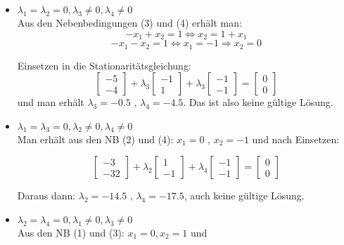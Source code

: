 \documentclass[a4paper, 12pt]{report}
\begin{document}
\begin{itemize}
  \item $\lambda_1 = \lambda_2 = 0, \lambda_3 \neq 0, \lambda_4 \neq 0$\\
  Aus den Nebenbedingungen (3) und (4) erhält man:\\
  $$ -x_1 + x_2 = 1 \Leftrightarrow x_2 = 1 + x_1$$
  $$ -x_1 - x_2 = 1 \Leftrightarrow x_1 = -1 \Rightarrow x_2 = 0$$

  Einsetzen in die Stationaritätsgleichung:
  $$\begin{bmatrix}-5\\-4\end{bmatrix} + \lambda_3 \begin{bmatrix}-1\\1\end{bmatrix} + \lambda_3 \begin{bmatrix}-1\\-1\end{bmatrix} = \begin{bmatrix}0\\0\end{bmatrix}$$
  und man erhält $\lambda_3 = -0.5 \text{ , } \lambda_4 = -4.5$. Das ist also keine gültige Lösung.

  \item $\lambda_1 = \lambda_3 = 0, \lambda_2 \neq 0, \lambda_4 \neq 0$\\
  Man erhält aus den NB (2) und (4): $x_1 = 0 \text{ , } x_2 = -1$ und nach Einsetzen:

  $$\begin{bmatrix}-3\\-32\end{bmatrix} + \lambda_2 \begin{bmatrix}1\\-1\end{bmatrix} + \lambda_4 \begin{bmatrix}-1\\-1\end{bmatrix} = \begin{bmatrix}0\\0\end{bmatrix}$$

  Daraus dann: $\lambda_2 = -14.5 \text{ , } \lambda_4 = -17.5$, auch keine gültige Lösung.

  \item $\lambda_2 = \lambda_4 = 0, \lambda_1 \neq 0, \lambda_3 \neq 0$\\
  Aus den NB (1) und (3): $x_1 = 0, x_2 = 1$ und


\end{itemize}
\end{document}
